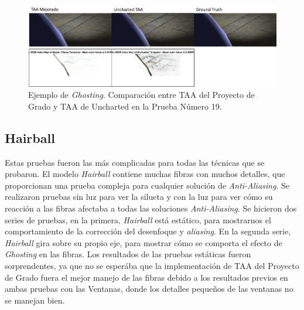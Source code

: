\documentclass[pregrado]{tesis-usb} %
\begin{document}
\begin{figure}[!htb]
	\centering
	\includegraphics[scale=0.5]{images/results/sphere_ghosting.png}
	\caption{Ejemplo de \textit{Ghosting}. Comparación  entre TAA del Proyecto de Grado y TAA de Uncharted en la Prueba Número 19.}\label{fig:sphere_ghosting}
\end{figure}

\FloatBarrier

\subsection{Hairball}
Estas pruebas fueron las más complicadas para todas las técnicas que se probaron. El modelo \textit{Hairball} contiene muchas fibras con muchos detalles, que proporcionan una prueba compleja para cualquier solución de \textit{Anti-Aliasing}. Se realizaron pruebas sin luz para ver la silueta y con la luz para ver cómo su reacción a las fibras afectaba a todas las soluciones \textit{Anti-Aliasing}. Se hicieron dos series de pruebas, en la primera, \textit{Hairball} está estático, para mostrarnos el comportamiento de la corrección del desenfoque y \textit{aliasing}. En la segunda serie, \textit{Hairball} gira sobre su propio eje, para mostrar cómo se comporta el efecto de \textit{Ghosting} en las fibras. Los resultados de las pruebas estáticas fueron sorprendentes, ya que no se esperába que la implementación de TAA del Proyecto de Grado fuera el mejor manejo de las fibras debido a los resultados previos en ambas pruebas con las Ventanas, donde los detalles pequeños de las ventanas no se manejan bien.
\end{document}
